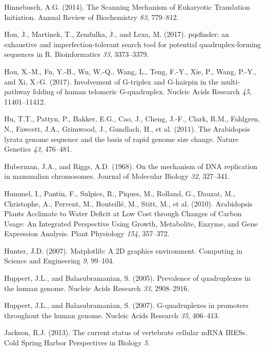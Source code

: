 \documentclass[12pt,a4paper,]{report}
\begin{document}
\leavevmode\hypertarget{ref-Hinnebusch2014}{}%
Hinnebusch, A.G. (2014). The Scanning Mechanism of Eukaryotic
Translation Initiation. Annual Review of Biochemistry \emph{83},
779--812.

\leavevmode\hypertarget{ref-Hon2017}{}%
Hon, J., Martínek, T., Zendulka, J., and Lexa, M. (2017). pqsfinder: an
exhaustive and imperfection-tolerant search tool for potential
quadruplex-forming sequences in R. Bioinformatics \emph{33}, 3373--3379.

\leavevmode\hypertarget{ref-Hou2017}{}%
Hou, X.-M., Fu, Y.-B., Wu, W.-Q., Wang, L., Teng, F.-Y., Xie, P., Wang,
P.-Y., and Xi, X.-G. (2017). Involvement of G-triplex and G-hairpin in
the multi-pathway folding of human telomeric G-quadruplex. Nucleic Acids
Research \emph{45}, 11401--11412.

\leavevmode\hypertarget{ref-Hu2011a}{}%
Hu, T.T., Pattyn, P., Bakker, E.G., Cao, J., Cheng, J.-F., Clark, R.M.,
Fahlgren, N., Fawcett, J.A., Grimwood, J., Gundlach, H., et al. (2011).
The Arabidopsis lyrata genome sequence and the basis of rapid genome
size change. Nature Genetics \emph{43}, 476--481.

\leavevmode\hypertarget{ref-Huberman1968}{}%
Huberman, J.A., and Riggs, A.D. (1968). On the mechanism of DNA
replication in mammalian chromosomes. Journal of Molecular Biology
\emph{32}, 327--341.

\leavevmode\hypertarget{ref-Hummel2010}{}%
Hummel, I., Pantin, F., Sulpice, R., Piques, M., Rolland, G., Dauzat,
M., Christophe, A., Pervent, M., Bouteillé, M., Stitt, M., et al.
(2010). Arabidopsis Plants Acclimate to Water Deficit at Low Cost
through Changes of Carbon Usage: An Integrated Perspective Using Growth,
Metabolite, Enzyme, and Gene Expression Analysis. Plant Physiology
\emph{154}, 357--372.

\leavevmode\hypertarget{ref-Hunter2007}{}%
Hunter, J.D. (2007). Matplotlib: A 2D graphics environment. Computing in
Science and Engineering \emph{9}, 99--104.

\leavevmode\hypertarget{ref-Huppert2005}{}%
Huppert, J.L., and Balasubramanian, S. (2005). Prevalence of
quadruplexes in the human genome. Nucleic Acids Research \emph{33},
2908--2916.

\leavevmode\hypertarget{ref-Huppert2007}{}%
Huppert, J.L., and Balasubramanian, S. (2007). G-quadruplexes in
promoters throughout the human genome. Nucleic Acids Research \emph{35},
406--413.

\leavevmode\hypertarget{ref-Jackson2013}{}%
Jackson, R.J. (2013). The current status of vertebrate cellular mRNA
IRESs. Cold Spring Harbor Perspectives in Biology \emph{5}.
\end{document}
